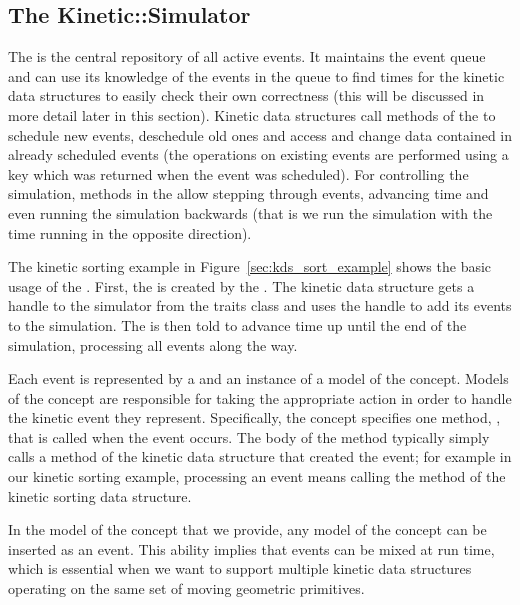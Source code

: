 \subsection{The Kinetic::Simulator\label{sec:kds_simulator}}


The  is the central repository of all active events.
It maintains the event queue and can use its knowledge of the events
in the queue to find times for the kinetic data structures to easily
check their own correctness (this will be discussed in more detail
later in this section). Kinetic data structures call methods of the
 to schedule new events, deschedule old ones and
access and change data contained in already scheduled events (the
operations on existing events are performed using a key which was
returned when the event was scheduled).  For controlling the
simulation, methods in the  allow stepping through
events, advancing time and even running the simulation backwards (that
is we run the simulation with the time running in the opposite
direction).

The kinetic sorting example in Figure~\ref{sec:kds_sort_example} shows the
basic usage of the . First, the 
is created by the . The kinetic data structure
gets a handle to the simulator from the traits class and uses the
handle to add its events to the simulation. The  is
then told to advance time up until the end of the simulation,
processing all events along the way.

Each event is represented by a  and an instance of a
model of the  concept.  Models of the 
concept are responsible for taking the appropriate action in order to
handle the kinetic event they represent.  Specifically, the
 concept specifies one method,
, that is called when the event occurs.
The body of the  method typically
simply calls a method of the kinetic data structure that created the
event; for example in our kinetic sorting example, processing an event
means calling the 
method of the kinetic sorting data structure.

In the model of the  concept that we provide, any
model of the  concept can be inserted as an event. This
ability implies that events can be mixed at run time, which is
essential when we want to support multiple kinetic data structures
operating on the same set of moving geometric primitives.

